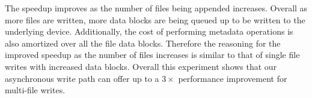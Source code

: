 The speedup improves as the number of files being appended increases. Overall
as more files are written, more data blocks are being queued up to be written
to the underlying device. Additionally, the cost of performing metadata
operations is also amortized over all the file data blocks. Therefore the
reasoning for the improved speedup as the number of files increases is similar
to that of single file writes with increased data blocks. Overall this
experiment shows that our asynchronous write path can offer up to a $3\times$
performance improvement for multi-file writes.
